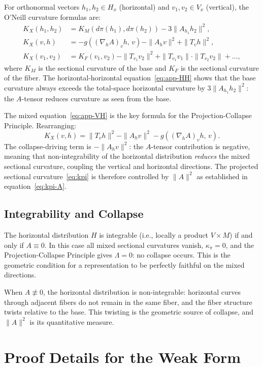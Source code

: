 \documentclass[12pt, oneside]{book}
\theoremstyle{plain-flyxion}
\theoremstyle{definition-flyxion}
\newcommand{\kpi}{\kappa_{\pi}}
\newcommand{\Lam}{\Lambda}
\begin{document}
For orthonormal vectors $h_1, h_2 \in H_x$ (horizontal) and $v_1, v_2 \in V_x$
(vertical), the O'Neill curvature formulas are:
\begin{align}
K_X(h_1, h_2) &= K_M(d\pi(h_1), d\pi(h_2)) - 3\|A_{h_1}h_2\|^2, \label{eq:app-HH}\\
K_X(v, h) &= -g\!\left((\nabla_h A)_v h,\, v\right) - \|A_h v\|^2 + \|T_v h\|^2,
  \label{eq:app-VH}\\
K_X(v_1, v_2) &= K_F(v_1, v_2) - \|T_{v_1}v_2\|^2 + \|T_{v_1}v_1\|\cdot\|T_{v_2}v_2\| + \ldots,
  \label{eq:app-VV}
\end{align}
where $K_M$ is the sectional curvature of the base and $K_F$ is the sectional curvature
of the fiber. The horizontal-horizontal equation~\eqref{eq:app-HH} shows that the base
curvature always exceeds the total-space horizontal curvature by $3\|A_{h_1}h_2\|^2$:
the $A$-tensor reduces curvature as seen from the base.

The mixed equation~\eqref{eq:app-VH} is the key formula for the Projection-Collapse
Principle. Rearranging:
\[
K_X(v,h) = \|T_v h\|^2 - \|A_h v\|^2 - g\!\left((\nabla_h A)_v h,\, v\right).
\]
The collapse-driving term is $-\|A_h v\|^2$: the $A$-tensor contribution is negative,
meaning that non-integrability of the horizontal distribution \emph{reduces} the mixed
sectional curvature, coupling the vertical and horizontal directions. The projected
sectional curvature~\eqref{eq:kpi} is therefore controlled by $\|A\|^2$ as established
in equation~\eqref{eq:kpi-A}.

\section*{Integrability and Collapse}

The horizontal distribution $H$ is integrable (i.e., locally a product $V \times M$) if
and only if $A \equiv 0$. In this case all mixed sectional curvatures vanish, $\kpi = 0$,
and the Projection-Collapse Principle gives $\Lam = 0$: no collapse occurs. This is the
geometric condition for a representation to be perfectly faithful on the mixed directions.

When $A \not\equiv 0$, the horizontal distribution is non-integrable: horizontal curves
through adjacent fibers do not remain in the same fiber, and the fiber structure twists
relative to the base. This twisting is the geometric source of collapse, and $\|A\|^2$
is its quantitative measure.



\chapter{Proof Details for the Weak Form}
\end{document}
